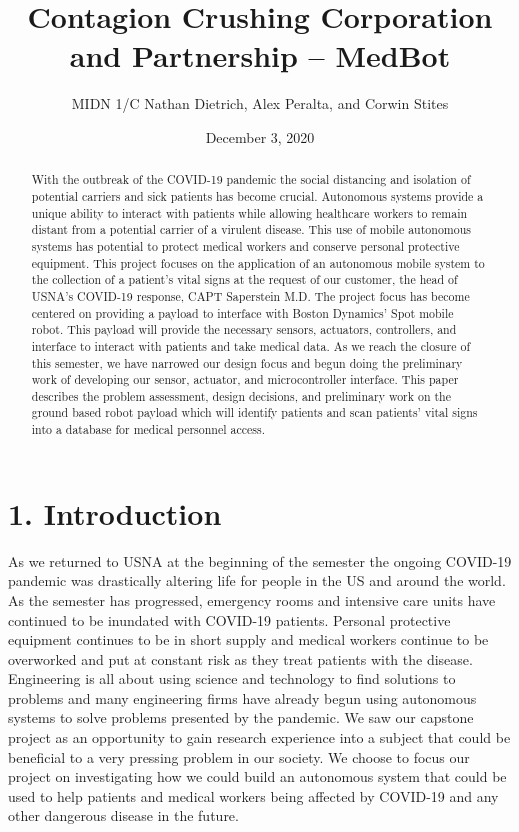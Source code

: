 ﻿\documentclass[10pt]{article}
\title{Contagion Crushing Corporation and Partnership -- MedBot}
\author{MIDN 1/C Nathan Dietrich, Alex Peralta, and Corwin Stites}
\date{December 3, 2020}
\begin{document}
\maketitle

\begin{abstract}
With the outbreak of the COVID-19 pandemic the social distancing and isolation of potential carriers and sick patients has become crucial. Autonomous systems provide a unique ability to interact with patients while allowing healthcare workers to remain distant from a potential carrier of a virulent disease. This use of mobile autonomous systems has potential to protect medical workers and conserve personal protective equipment. This project focuses on the application of an autonomous mobile system to the collection of a patient’s vital signs at the request of our customer, the head of USNA’s COVID-19 response, CAPT Saperstein M.D. The project focus has become centered on providing a payload to interface with Boston Dynamics’ Spot mobile robot. This payload will provide the necessary sensors, actuators, controllers, and interface to interact with patients and take medical data. As we reach the closure of this semester, we have narrowed our design focus and begun doing the preliminary work of developing our sensor, actuator, and microcontroller interface. This paper describes the problem assessment, design decisions, and preliminary work on the ground based robot payload which will identify patients and scan patients’ vital signs into a database for medical personnel access. 
\end{abstract}


\section{1. Introduction}        
As we returned to USNA at the beginning of the semester the ongoing COVID-19 pandemic was drastically altering life for people in the US and  around the world. As the semester has progressed, emergency rooms and intensive care units have continued to be  inundated with COVID-19 patients. Personal protective equipment continues to be in short supply and medical workers continue to be overworked and put at constant risk as they treat patients with the disease. Engineering is all about using science and technology to find solutions to problems and many engineering firms have already begun using autonomous systems to solve problems presented by the pandemic. We saw our capstone project as an opportunity to gain research experience into a subject that could be beneficial to a very pressing problem in our society. We choose to focus our project on investigating how we could build an autonomous system that could be used to help patients and medical workers being affected by COVID-19 and any other dangerous disease in the future.
\end{document}
